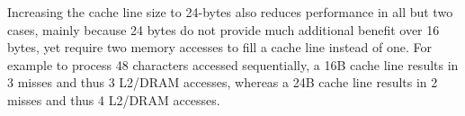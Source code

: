Increasing the cache line size to 24-bytes also reduces performance in all but two cases, mainly
because 24 bytes do not provide much additional benefit over 16 bytes, yet require two memory accesses to fill a cache line instead of one.
For example to process 48 characters accessed sequentially, a 16B cache line results in 3 misses and thus 3 L2/DRAM accesses, whereas a 24B cache line results in 2 misses and thus 4 L2/DRAM accesses.




